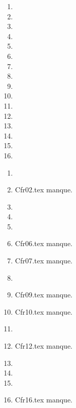  
 
\begin{enumerate}
  \item  
  \item  
  \item  
  \item  
  \item  
  \item  
  \item  
  \item  
  \item  
  \item  
  \item  
  \item  
  \item  
  \item  
  \item  
  \item  
\end{enumerate} 
\clearpage 
{}
\begin{enumerate}
  \item  
  \item Cfr02.tex manque. 
  \item  
  \item  
  \item  
  \item Cfr06.tex manque. 
  \item Cfr07.tex manque. 
  \item  
  \item Cfr09.tex manque. 
  \item Cfr10.tex manque. 
  \item  
  \item Cfr12.tex manque. 
  \item  
  \item  
  \item  
  \item Cfr16.tex manque. 
\end{enumerate} 
